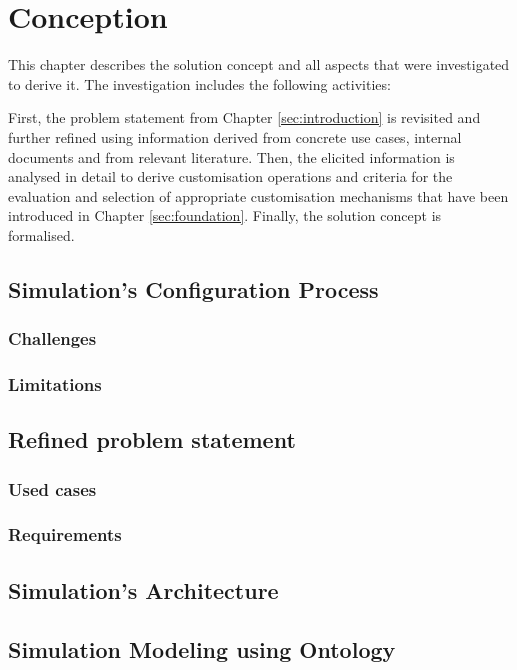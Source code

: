 \section{Conception\label{sec:conception}}

This chapter describes the solution concept and all aspects that were investigated to derive it.
The investigation includes the following activities:

First, the problem statement from Chapter \ref{sec:introduction} is revisited and further refined
using information derived from concrete use cases, internal documents and from relevant literature.
Then, the elicited information is analysed in detail to derive customisation operations and
criteria for the evaluation and selection of appropriate customisation mechanisms that have been
introduced in Chapter \ref{sec:foundation}. Finally, the solution concept is formalised.

\subsection{Simulation's Configuration Process}
    \subsubsection{Challenges}
    
    \subsubsection{Limitations}


\subsection{Refined problem statement}
    \subsubsection{Used cases}
    
    \subsubsection{Requirements}


\subsection{Simulation's Architecture}


\subsection{Simulation Modeling using Ontology}
